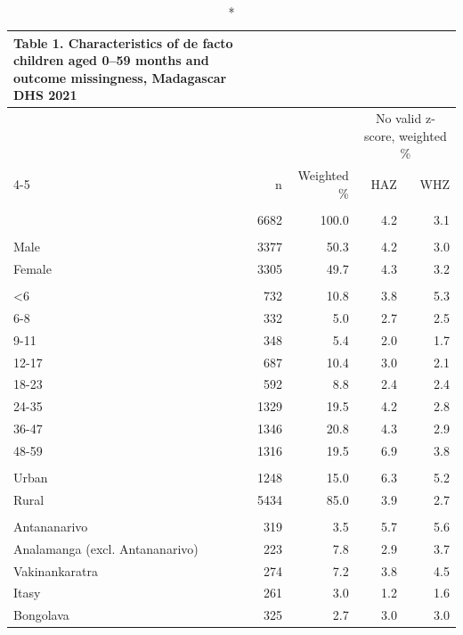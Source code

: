 \begingroup
\fontsize{8.0pt}{10.0pt}\selectfont
\setlength{\LTpost}{0mm}
\begin{longtable}{l|rrrr}
\caption*{
{\fontsize{20}{25}\selectfont  Table 1. Characteristics of de facto children aged 0–59 months and outcome missingness, Madagascar DHS 2021\fontsize{8}{10}\selectfont }
} \\ 
\toprule
 &  &  & \multicolumn{2}{c}{{No valid z-score, weighted \%}} \\ 
\cmidrule(lr){4-5}
 & n & Weighted \% & HAZ & WHZ \\ 
\midrule\endhead\addlinespace[2.5pt]
\multicolumn{5}{l}{All children} \\[2.5pt] 
\midrule\addlinespace[2.5pt]
 & 6682 & 100.0 & 4.2 & 3.1 \\ 
\midrule\addlinespace[2.5pt]
\multicolumn{5}{l}{Sex} \\[2.5pt] 
\midrule\addlinespace[2.5pt]
Male & 3377 & 50.3 & 4.2 & 3.0 \\ 
Female & 3305 & 49.7 & 4.3 & 3.2 \\ 
\midrule\addlinespace[2.5pt]
\multicolumn{5}{l}{Age (months)} \\[2.5pt] 
\midrule\addlinespace[2.5pt]
<6 & 732 & 10.8 & 3.8 & 5.3 \\ 
6-8 & 332 & 5.0 & 2.7 & 2.5 \\ 
9-11 & 348 & 5.4 & 2.0 & 1.7 \\ 
12-17 & 687 & 10.4 & 3.0 & 2.1 \\ 
18-23 & 592 & 8.8 & 2.4 & 2.4 \\ 
24-35 & 1329 & 19.5 & 4.2 & 2.8 \\ 
36-47 & 1346 & 20.8 & 4.3 & 2.9 \\ 
48-59 & 1316 & 19.5 & 6.9 & 3.8 \\ 
\midrule\addlinespace[2.5pt]
\multicolumn{5}{l}{Residence} \\[2.5pt] 
\midrule\addlinespace[2.5pt]
Urban & 1248 & 15.0 & 6.3 & 5.2 \\ 
Rural & 5434 & 85.0 & 3.9 & 2.7 \\ 
\midrule\addlinespace[2.5pt]
\multicolumn{5}{l}{Region} \\[2.5pt] 
\midrule\addlinespace[2.5pt]
Antananarivo & 319 & 3.5 & 5.7 & 5.6 \\ 
Analamanga (excl. Antananarivo) & 223 & 7.8 & 2.9 & 3.7 \\ 
Vakinankaratra & 274 & 7.2 & 3.8 & 4.5 \\ 
Itasy & 261 & 3.0 & 1.2 & 1.6 \\ 
Bongolava & 325 & 2.7 & 3.0 & 3.0 \\ 

\end{longtable}
